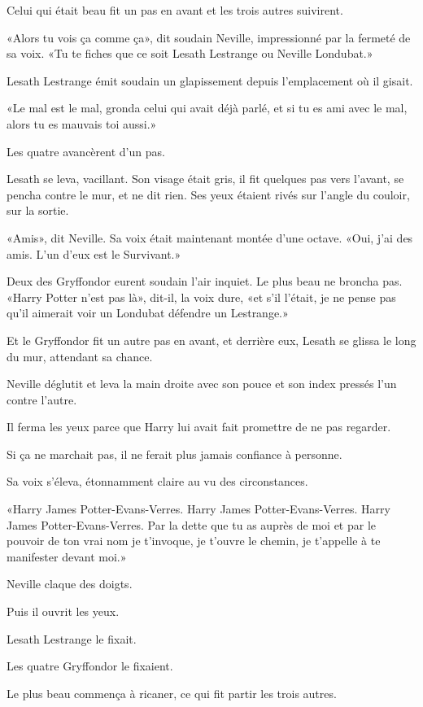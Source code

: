 Celui qui était beau fit un pas en avant et les trois autres suivirent.

«Alors tu vois ça comme ça», dit soudain Neville, impressionné par la fermeté de sa voix. «Tu te fiches que ce soit Lesath Lestrange ou Neville Londubat.»

Lesath Lestrange émit soudain un glapissement depuis l'emplacement où il gisait.

«Le mal est le mal, gronda celui qui avait déjà parlé, et si tu es ami avec le mal, alors tu es mauvais toi aussi.»

Les quatre avancèrent d'un pas.

Lesath se leva, vacillant. Son visage était gris, il fit quelques pas vers l'avant, se pencha contre le mur, et ne dit rien. Ses yeux étaient rivés sur l'angle du couloir, sur la sortie.

«Amis», dit Neville. Sa voix était maintenant montée d'une octave. «Oui, j'ai des amis. L'un d'eux est le Survivant.»

Deux des Gryffondor eurent soudain l'air inquiet. Le plus beau ne broncha pas. «Harry Potter n'est pas là», dit-il, la voix dure, «et s'il l'était, je ne pense pas qu'il aimerait voir un Londubat défendre un Lestrange.»

Et le Gryffondor fit un autre pas en avant, et derrière eux, Lesath se glissa le long du mur, attendant sa chance.

Neville déglutit et leva la main droite avec son pouce et son index pressés l'un contre l'autre.

Il ferma les yeux parce que Harry lui avait fait promettre de ne pas regarder.

Si ça ne marchait pas, il ne ferait plus jamais confiance à personne.

Sa voix s'éleva, étonnamment claire au vu des circonstances.

«Harry James Potter-Evans-Verres. Harry James Potter-Evans-Verres. Harry James Potter-Evans-Verres. Par la dette que tu as auprès de moi et par le pouvoir de ton vrai nom je t'invoque, je t'ouvre le chemin, je t'appelle à te manifester devant moi.»

Neville claque des doigts.

Puis il ouvrit les yeux.

Lesath Lestrange le fixait.

Les quatre Gryffondor le fixaient.

Le plus beau commença à ricaner, ce qui fit partir les trois autres.

